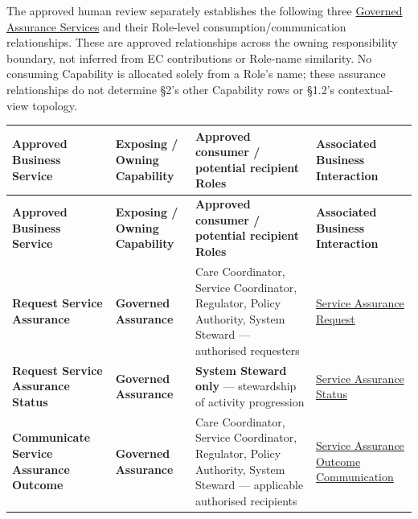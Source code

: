 \label{rad:dependencies:101}

The approved human review separately establishes the following three \hyperref[rad:assurance:156]{Governed Assurance Services} and their Role-level consumption/\allowbreak{}communication relationships. These are approved relationships across the owning responsibility boundary, not inferred from EC contributions or Role-name similarity. No consuming Capability is allocated solely from a Role's name; these assurance relationships do not determine §2's other Capability rows or §1.2's contextual-view topology.

\label{rad:dependencies:103}
\begingroup\small\setlength{\TableWidth}{\dimexpr\linewidth-8\tabcolsep-5\arrayrulewidth\relax}
\begin{longtable}{|>{\raggedright\arraybackslash}p{0.25\TableWidth}|>{\raggedright\arraybackslash}p{0.25\TableWidth}|>{\raggedright\arraybackslash}p{0.25\TableWidth}|>{\raggedright\arraybackslash}p{0.25\TableWidth}|}
\hline\rowcolor{TableHead}\textbf{Approved Business Service} & \textbf{Exposing /\allowbreak{} Owning Capability} & \textbf{Approved consumer /\allowbreak{} potential recipient Roles} & \textbf{Associated Business Interaction}\\\hline\endfirsthead
\hline\rowcolor{TableHead}\textbf{Approved Business Service} & \textbf{Exposing /\allowbreak{} Owning Capability} & \textbf{Approved consumer /\allowbreak{} potential recipient Roles} & \textbf{Associated Business Interaction}\\\hline\endhead
\hline\endfoot
\textbf{Request Service Assurance} & \textbf{Governed Assurance} & Care Coordinator, Service Coordinator, Regulator, Policy Authority, System Steward — authorised requesters & \href{https://github.com/fhirfactory/harmonia/blob/98410db60155198a75f74c79d98060070209faa1/docs/markdown/03-business-architecture/collaborations-interactions/interactions.md\#service-assurance-request}{Service Assurance Request}\\\hline
\textbf{Request Service Assurance Status} & \textbf{Governed Assurance} & \textbf{System Steward only} — stewardship of activity progression & \href{https://github.com/fhirfactory/harmonia/blob/98410db60155198a75f74c79d98060070209faa1/docs/markdown/03-business-architecture/collaborations-interactions/interactions.md\#service-assurance-status}{Service Assurance Status}\\\hline
\textbf{Communicate Service Assurance Outcome} & \textbf{Governed Assurance} & Care Coordinator, Service Coordinator, Regulator, Policy Authority, System Steward — applicable authorised recipients & \href{https://github.com/fhirfactory/harmonia/blob/98410db60155198a75f74c79d98060070209faa1/docs/markdown/03-business-architecture/collaborations-interactions/interactions.md\#service-assurance-outcome-communication}{Service Assurance Outcome Communication}\\\hline
\end{longtable}\endgroup
{}\label{rad:dependencies:109}

